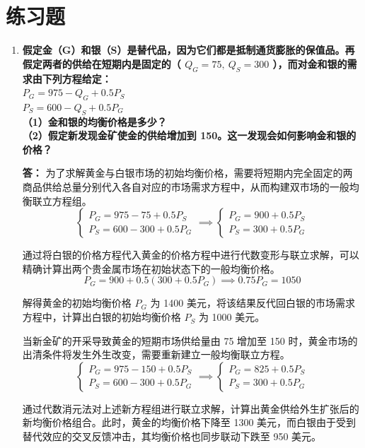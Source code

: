 	\section{练习题}
	\begin{enumerate}[label=\textbf{\arabic*.}, leftmargin=*]
		\item \textbf{假定金（G）和银（S）是替代品，因为它们都是抵制通货膨胀的保值品。再假定两者的供给在短期内是固定的（ $Q_{G}=75,\ Q_{S}=300$ ），而对金和银的需求由下列方程给定：\\ $P_{G} = 975 - Q_{G} + 0.5 P_{S}$ \\ $P_{S} = 600 - Q_{S} + 0.5 P_{G}$ \\（1）金和银的均衡价格是多少？\\（2）假定新发现金矿使金的供给增加到 150。这一发现会如何影响金和银的价格？}
		
		\textbf{答：}
		为了求解黄金与白银市场的初始均衡价格，需要将短期内完全固定的两商品供给总量分别代入各自对应的市场需求方程中，从而构建双市场的一般均衡联立方程组。
		\[
		\begin{cases}
			P_G = 975 - 75 + 0.5 P_S \\
			P_S = 600 - 300 + 0.5 P_G
		\end{cases}
		\implies
		\begin{cases}
			P_G = 900 + 0.5 P_S \\
			P_S = 300 + 0.5 P_G
		\end{cases}
		\]
		
		通过将白银的价格方程代入黄金的价格方程中进行代数变形与联立求解，可以精确计算出两个贵金属市场在初始状态下的一般均衡价格。
		\[
		P_G = 900 + 0.5 (300 + 0.5 P_G) \implies 0.75 P_G = 1050
		\]
		
		解得黄金的初始均衡价格 $P_G$ 为 1400 美元，将该结果反代回白银的市场需求方程中，计算出白银的初始均衡价格 $P_S$ 为 1000 美元。
		
		当新金矿的开采导致黄金的短期市场供给量由 75 增加至 150 时，黄金市场的出清条件将发生外生改变，需要重新建立一般均衡联立方程。
		\[
		\begin{cases}
			P_G = 975 - 150 + 0.5 P_S \\
			P_S = 600 - 300 + 0.5 P_G
		\end{cases}
		\implies
		\begin{cases}
			P_G = 825 + 0.5 P_S \\
			P_S = 300 + 0.5 P_G
		\end{cases}
		\]
		
		通过代数消元法对上述新方程组进行联立求解，计算出黄金供给外生扩张后的新均衡价格组合。此时，黄金的均衡价格下降至 1300 美元，而白银由于受到替代效应的交叉反馈冲击，其均衡价格也同步联动下跌至 950 美元。
		

\end{enumerate}
